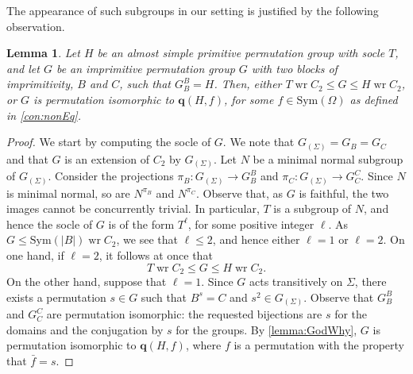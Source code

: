 \documentclass[a4paper]{amsart}
\newcommand{\Sym}{\mathrm{Sym}}
\renewcommand{\wr}{\mathop{\mathrm{wr}}}
\newcommand{\qrk}{\mathbf{q}}
\newtheorem{lemma}[theorem]{Lemma}
\theoremstyle{definition}
\begin{document}
The appearance of such subgroups in our setting is justified by the following observation.
\begin{lemma}\label{lem:imprimitiveAS}
    Let $H$ be an almost simple primitive permutation group with socle $T$, and let $G$ be an imprimitive permutation group $G$ with two blocks of imprimitivity, $B$ and $C$, such that $G_B^B = H$. Then, either $T \wr C_2 \le G \le H \wr C_2$, or $G$ is permutation isomorphic to $\qrk(H,f)$, for some $f\in \Sym(\Omega)$ as defined in \cref{con:nonEq}.
\end{lemma}
\begin{proof}
    We start by computing the socle of $G$. We note that $G_{(\Sigma)} = G_B = G_C$ and that $G$ is an extension of $C_2$ by $G_{(\Sigma)}$. Let $N$ be a minimal normal subgroup of $G_{(\Sigma)}$. Consider the projections $\pi_B: G_{(\Sigma)} \to G_B^B$ and $\pi_C: G_{(\Sigma)} \to G_C^C$. Since $N$ is minimal normal, so are $N^{\pi_B}$ and $N^{\pi_C}$. Observe that, as $G$ is faithful, the two images cannot be concurrently trivial. In particular, $T$ is a subgroup of $N$, and hence the socle of $G$ is of the form $T^\ell$, for some positive integer $\ell$. As $G \le \Sym(|B|) \wr C_2$, we see that $\ell \le 2$, and hence either $\ell=1$ or $\ell=2$. On one hand, if $\ell=2$, it follows at once that
    \[ T \wr C_2 \le G \le H \wr C_2 .\]
    On the other hand, suppose that $\ell=1$. Since $G$ acts transitively on $\Sigma$, there exists a permutation $s\in G$ such that $B^s = C$ and $s^2 \in G_{(\Sigma)}$. Observe that $G_B^B$ and $G_C^C$ are permutation isomorphic: the requested bijections are $s$ for the domains and the conjugation by $s$ for the groups. By \cref{lemma:GodWhy}, $G$ is permutation isomorphic to $\qrk(H,f)$, where $f$ is a permutation with the property that $\bar f = s$.
\end{proof}
\end{document}
